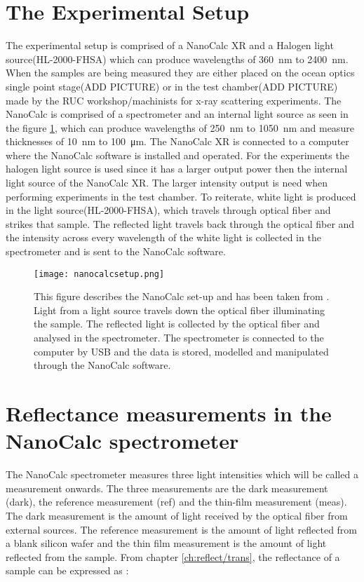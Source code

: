 \documentclass[MasterThesisMain.tex]{subfiles}
\begin{document}
\section{The Experimental Setup}
The experimental setup is comprised of a NanoCalc XR and a Halogen light source(HL-2000-FHSA) which can produce wavelengths of \SI{360}{\nano\meter} to \SI{2400}{\nano\meter}. When the samples are being measured they are either placed on the ocean optics single point stage(ADD PICTURE) or in the test chamber(ADD PICTURE) made by the RUC workshop/machinists for x-ray scattering experiments. The NanoCalc is comprised of a spectrometer and an internal light source as seen in the figure \ref{fig:nanocalcsetup}, which can produce wavelengths of \SI{250}{\nano\meter} to \SI{1050}{\nano\meter} and measure thicknesses of \SI{10}{\nano\meter} to \SI{100}{\micro\meter}. The NanoCalc XR is connected to a computer where the NanoCalc software is installed and operated. For the experiments the halogen light source is used since it has a larger output power then the internal light source of the NanoCalc XR. The larger intensity output is need when performing experiments in the test chamber. To reiterate, white light is produced in the light source(HL-2000-FHSA), which travels through optical fiber and strikes that sample. The reflected light travels back through the optical fiber and the intensity across every wavelength of the white light is collected in the spectrometer and is sent to the NanoCalc software.  
	
	\begin{figure}
	\centering
		\texttt{[image: nanocalcsetup.png]}
		\caption{This figure describes the NanoCalc set-up and has been taken from \cite{nanocalcmanual}. Light from a light source travels down the optical fiber illuminating the sample. The reflected light is collected by the optical fiber and analysed in the spectrometer. The spectrometer is connected to the computer by USB and the data is stored, modelled and manipulated through the NanoCalc software.}
		\label{fig:nanocalcsetup}
	\end{figure}
	
\section{Reflectance measurements in the NanoCalc spectrometer}
The NanoCalc spectrometer measures three light intensities which will be called a measurement onwards. The three measurements are the dark measurement (dark), the reference measurement (ref) and the thin-film measurement (meas). The dark measurement is the amount of light received by the optical fiber from external sources. The reference measurement is the amount of light reflected from a blank silicon wafer and the thin film measurement is the amount of light reflected from the sample. From chapter \ref{ch:reflect/trans}, the reflectance of a sample can be expressed as :
\end{document}
